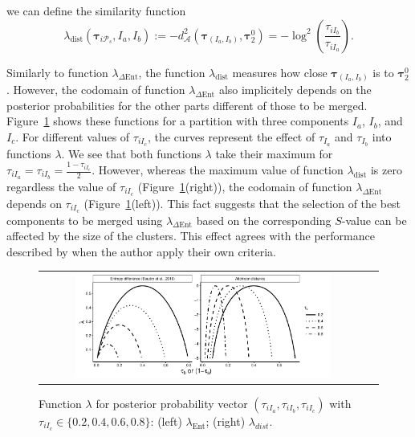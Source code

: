 \documentclass[submit]{smj}
\theoremstyle{definition}
\newcommand{\m}[1]{\boldsymbol{#1}}
\begin{document}
we can define the similarity function
\[
\lambda_{\text{dist}}(\m\tau_{i \mathcal{P}_s},  I_a,  I_b) := -d^2_\mathcal{A}\left(\m\tau_{\left(I_a, I_b\right)}, \m\tau_2^0 \right) = -\log^2 \left(\frac{ \tau_{iI_b} }{ \tau_{iI_a} }\right).
\]



Similarly to function $\lambda_{\Delta\text{Ent}}$, the function $\lambda_{\text{dist}}$  measures how close $\m\tau_{\left(I_a, I_b\right)}$ is to $\m\tau_2^0$. However, the codomain of function $\lambda_{\Delta\text{Ent}}$ also implicitely depends on the posterior probabilities for the other parts different of those to be merged. Figure~\ref{symetric} shows these functions for a partition with three components $I_a$, $I_b$, and $I_c$. For different values of $\tau_{iI_c}$, the curves represent the effect of $\tau_{I_a}$ and $\tau_{I_b}$ into functions $\lambda$. We see that both functions $\lambda$ take their maximum for $\tau_{iI_a}=\tau_{iI_b}=\frac{1-\tau_{i I_c}}{2}$. However, whereas the maximum value of function $\lambda_{\text{dist}}$ is zero regardless the value of $\tau_{iI_c}$ (Figure~\ref{symetric}(right)), the codomain of function $\lambda_{\Delta\text{Ent}}$ depends on $\tau_{iI_c}$ (Figure~\ref{symetric}(left)). This fact suggests that the selection of the best components to be merged using $\lambda_{\Delta\text{Ent}}$ based on the corresponding $S$-value can be affected by the size of the clusters. This effect agrees with the performance described by \cite{baudry2010combining} when the author apply their own criteria.

\begin{figure}[htpb]
\begin{center}
\begin{tabular}{cc}
  \includegraphics[width=0.8\textwidth]{figures/entr_dist.pdf} \\
 \end{tabular}
 \caption{Function $\lambda$ for posterior probability 
vector $\left(\tau_{iI_a}, \tau_{iI_b}, \tau_{iI_c} \right)$ with $\tau_{iI_c} \in \{0.2, 0.4, 0.6, 0.8\}$: (left) $\lambda_{\text{Ent}}$; (right) $\lambda_{dist}$.} 
\label{symetric}
\end{center}
\end{figure}
\end{document}
